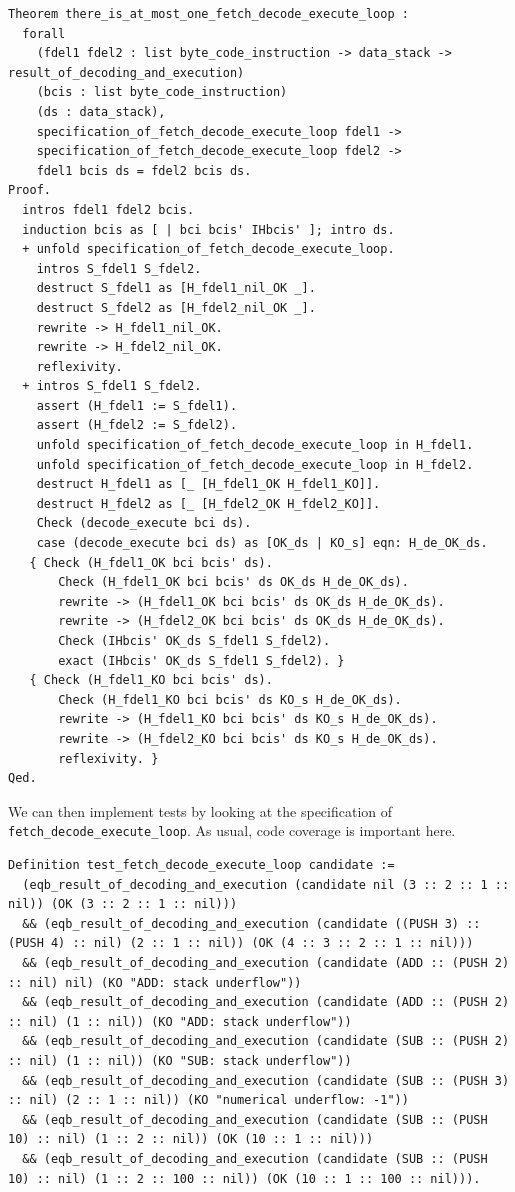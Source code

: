 \documentclass{article}
\begin{document}
\begin{lstlisting}
Theorem there_is_at_most_one_fetch_decode_execute_loop :
  forall
    (fdel1 fdel2 : list byte_code_instruction -> data_stack -> result_of_decoding_and_execution)
    (bcis : list byte_code_instruction)
    (ds : data_stack),
    specification_of_fetch_decode_execute_loop fdel1 ->
    specification_of_fetch_decode_execute_loop fdel2 ->
    fdel1 bcis ds = fdel2 bcis ds.
Proof.
  intros fdel1 fdel2 bcis.
  induction bcis as [ | bci bcis' IHbcis' ]; intro ds.
  + unfold specification_of_fetch_decode_execute_loop.
    intros S_fdel1 S_fdel2.
    destruct S_fdel1 as [H_fdel1_nil_OK _].
    destruct S_fdel2 as [H_fdel2_nil_OK _].
    rewrite -> H_fdel1_nil_OK.
    rewrite -> H_fdel2_nil_OK.
    reflexivity.
  + intros S_fdel1 S_fdel2.
    assert (H_fdel1 := S_fdel1).
    assert (H_fdel2 := S_fdel2).
    unfold specification_of_fetch_decode_execute_loop in H_fdel1.
    unfold specification_of_fetch_decode_execute_loop in H_fdel2.
    destruct H_fdel1 as [_ [H_fdel1_OK H_fdel1_KO]].
    destruct H_fdel2 as [_ [H_fdel2_OK H_fdel2_KO]].
    Check (decode_execute bci ds).
    case (decode_execute bci ds) as [OK_ds | KO_s] eqn: H_de_OK_ds.
   { Check (H_fdel1_OK bci bcis' ds).
       Check (H_fdel1_OK bci bcis' ds OK_ds H_de_OK_ds).
       rewrite -> (H_fdel1_OK bci bcis' ds OK_ds H_de_OK_ds).
       rewrite -> (H_fdel2_OK bci bcis' ds OK_ds H_de_OK_ds).
       Check (IHbcis' OK_ds S_fdel1 S_fdel2).
       exact (IHbcis' OK_ds S_fdel1 S_fdel2). }
   { Check (H_fdel1_KO bci bcis' ds).
       Check (H_fdel1_KO bci bcis' ds KO_s H_de_OK_ds).
       rewrite -> (H_fdel1_KO bci bcis' ds KO_s H_de_OK_ds).
       rewrite -> (H_fdel2_KO bci bcis' ds KO_s H_de_OK_ds).
       reflexivity. }
Qed.
\end{lstlisting}

We can then implement tests by looking at the specification of \texttt{fetch\_decode\_execute\_loop}. As usual, code coverage is important here. 

\begin{lstlisting}
Definition test_fetch_decode_execute_loop candidate :=
  (eqb_result_of_decoding_and_execution (candidate nil (3 :: 2 :: 1 :: nil)) (OK (3 :: 2 :: 1 :: nil)))
  && (eqb_result_of_decoding_and_execution (candidate ((PUSH 3) :: (PUSH 4) :: nil) (2 :: 1 :: nil)) (OK (4 :: 3 :: 2 :: 1 :: nil)))
  && (eqb_result_of_decoding_and_execution (candidate (ADD :: (PUSH 2) :: nil) nil) (KO "ADD: stack underflow"))
  && (eqb_result_of_decoding_and_execution (candidate (ADD :: (PUSH 2) :: nil) (1 :: nil)) (KO "ADD: stack underflow"))
  && (eqb_result_of_decoding_and_execution (candidate (SUB :: (PUSH 2) :: nil) (1 :: nil)) (KO "SUB: stack underflow"))
  && (eqb_result_of_decoding_and_execution (candidate (SUB :: (PUSH 3) :: nil) (2 :: 1 :: nil)) (KO "numerical underflow: -1"))
  && (eqb_result_of_decoding_and_execution (candidate (SUB :: (PUSH 10) :: nil) (1 :: 2 :: nil)) (OK (10 :: 1 :: nil)))
  && (eqb_result_of_decoding_and_execution (candidate (SUB :: (PUSH 10) :: nil) (1 :: 2 :: 100 :: nil)) (OK (10 :: 1 :: 100 :: nil))).
\end{lstlisting}
\end{document}
